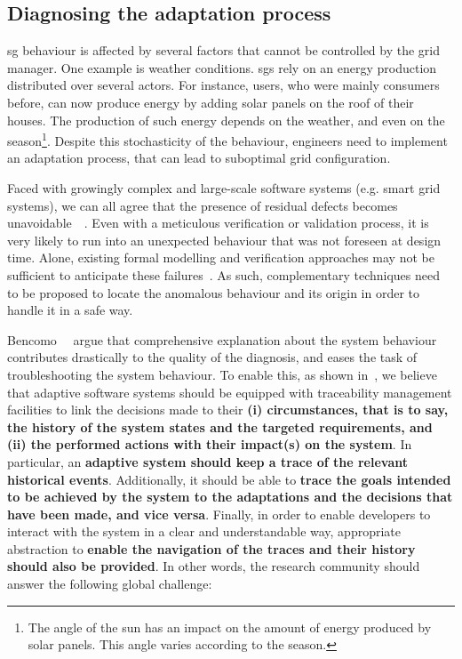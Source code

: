 \subsection{Diagnosing the adaptation process}
\label{sec:intro:challenges:diagnosis}

\Gls{sg} \gls{behaviour} is affected by several factors that cannot be controlled by the grid manager.
One example is weather conditions.
\Glspl{sg} rely on an energy production distributed over several actors.
For instance, users, who were mainly consumers before, can now produce energy by adding solar panels on the roof of their houses.
The production of such energy depends on the weather, and even on the season\footnote{The angle of the sun has an impact on the amount of energy produced by solar panels. This angle varies according to the season.}.
Despite this stochasticity of the \gls{behaviour}, engineers need to implement an adaptation process, that can lead to suboptimal grid configuration.

Faced with growingly complex and large-scale software systems (e.g. smart grid systems), we can all agree that the presence of residual defects becomes unavoidable~~\cite{DBLP:conf/icse/BarbosaLMJ17, DBLP:conf/icse/MongielloPS15, DBLP:conf/icse/HassanBB15}. 
Even with a meticulous verification or validation process, it is very likely to run into an unexpected behaviour that was not foreseen at design time. 
Alone, existing formal modelling and verification approaches may not be sufficient to anticipate these failures~\cite{DBLP:conf/icse/TaharaOH17}. 
As such, complementary techniques need to be proposed to locate the anomalous behaviour and its origin in order to handle it in a safe way.

Bencomo~\etal~\cite{DBLP:conf/iceccs/BencomoWSW12} argue that comprehensive explanation about the system behaviour contributes drastically to the quality of the diagnosis, and eases the task of troubleshooting the system behaviour. 
To enable this, as shown in~, we believe that adaptive software systems should be equipped with traceability management facilities to link the decisions made to their \textbf{(i) circumstances, that is to say, the history of the system states and the targeted requirements, and (ii) the performed actions with their impact(s) on the system}.
In particular, an \textbf{adaptive system should keep a trace of the relevant historical events}.
Additionally, it should be able to \textbf{trace the goals intended to be achieved by the system to the adaptations and the decisions that have been made, and vice versa}. 
Finally, in order to enable developers to interact with the system in a clear and understandable way, appropriate abstraction to \textbf{enable the navigation of the traces and their history should also be provided}.
In other words, the research community should answer the following global challenge:
\vspace{-2em}

